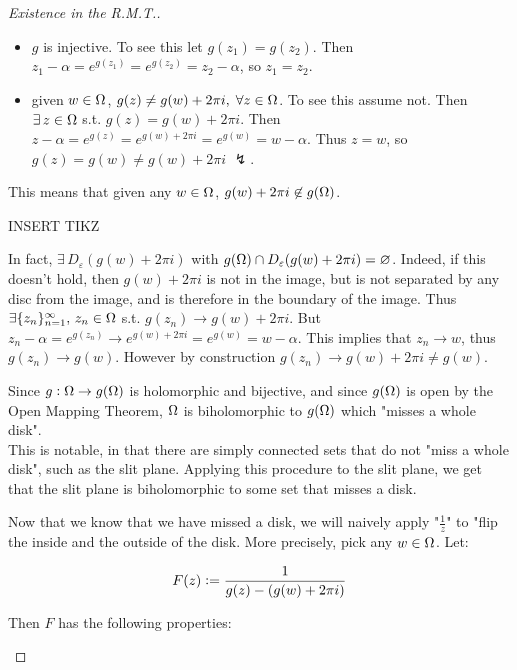 \begin{proof}[Existence in the R.M.T.]
\begin{enumerate}
    \begin{itemize}
        \item $g$ is injective. To see this let $g(z_1) = g(z_2)$. Then $z_1 - \alpha = e^{g(z_1)} = e^{g(z_2)} = z_2 - \alpha$, so $z_1 = z_2$.
        \item given $w \in \Omega$, $g(z) \neq g(w) + 2 \pi i, \; \forall z \in \Omega$. To see this assume not. Then $\exists \, z \in \Omega$ s.t. $g(z) = g(w) + 2 \pi i$. Then $z - \alpha = e^{g(z)} = e^{g(w) + 2 \pi i}  = e^{g(w) } = w - \alpha$. Thus $z = w$, so $g(z) = g(w) \neq g(w) + 2 \pi i$ $\lightning$.
        
        
    \end{itemize}
    This means that given any $w \in \Omega$, $g(w) + 2 \pi i \not\in g(\Omega)$.
        
        INSERT TIKZ
        
    In fact, $\exists \, D_\varepsilon(g(w) + 2 \pi i)$ with $ g ( \Omega ) \cap  D_\varepsilon(g(w) + 2 \pi i) = \varnothing$. Indeed, if this doesn't hold, then $g(w) + 2 \pi i$ is not in the image, but is not separated by any disc from the image, and is therefore in the boundary of the image. Thus $\exists \{ z_n\} _{n=1} ^ \infty, \, z_n \in \Omega$ s.t. $g(z_n) \to g(w) + 2 \pi i$. But $z_n - \alpha = e^{g(z_n)} \to e^{g(w) + 2 \pi i} = e^{g(w)} = w - \alpha $. This implies that $z_n \to w$, thus $g(z_n) \to g(w)$. However by construction $g(z_n) \to g(w) + 2 \pi i \neq g(w)$.


\begin{remark}
Since $g:\Omega \to g(\Omega)$ is holomorphic and bijective, and since $g(\Omega)$ is open by the Open Mapping Theorem, $\Omega $ is biholomorphic to $g(\Omega)$ which "misses a whole disk".\\

This is notable, in that there are simply connected sets that do not "miss a whole disk", such as the slit plane. Applying this procedure to the slit plane, we get that the slit plane is biholomorphic to some set that misses a disk.
\end{remark}

Now that we know that we have missed a disk, we will naively apply "$\frac{1}{z}$" to "flip the inside and the outside of the disk. More precisely, pick any $w \in \Omega$. Let:

\begin{align*}
    F(z) \vcentcolon = \frac{1}{g(z) - ( g( w) + 2 \pi i) }
\end{align*}

Then $F$ has the following properties:


\end{enumerate}
\end{proof}
